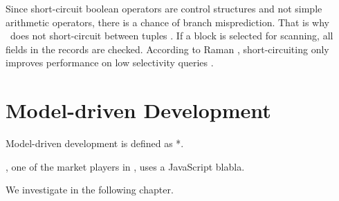 Since short-circuit boolean operators are control structures and not simple arithmetic operators, there is a chance of branch misprediction. That is why \blink~does not short-circuit between tuples \cite{Raman2008-gi, Johnson2008-cp}. If a block is selected for scanning, all fields in the records are checked. According to Raman \ea, short-circuiting only improves performance on low selectivity queries \cite{Raman2008-gi}.

\section{Model-driven Development}
\label{sec:Model-driven Development}
Model-driven development is defined as *.

\mendix, one of the market players in \mdd, uses a JavaScript blabla.

We investigate \genusSoftware in the following chapter.


